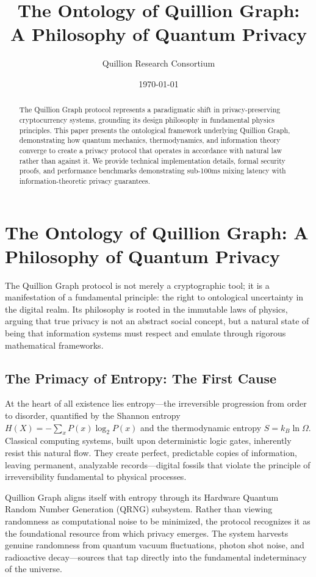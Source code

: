 \documentclass[11pt,a4paper]{article}
\title{\textbf{The Ontology of Quillion Graph:\\A Philosophy of Quantum Privacy}}
\author{Quillion Research Consortium}
\date{\today}
\begin{document}
\maketitle

\begin{abstract}
The Quillion Graph protocol represents a paradigmatic shift in privacy-preserving cryptocurrency systems, grounding its design philosophy in fundamental physics principles. This paper presents the ontological framework underlying Quillion Graph, demonstrating how quantum mechanics, thermodynamics, and information theory converge to create a privacy protocol that operates in accordance with natural law rather than against it. We provide technical implementation details, formal security proofs, and performance benchmarks demonstrating sub-100ms mixing latency with information-theoretic privacy guarantees.
\end{abstract}

\section{The Ontology of Quillion Graph: A Philosophy of Quantum Privacy}

The Quillion Graph protocol is not merely a cryptographic tool; it is a manifestation of a fundamental principle: the right to ontological uncertainty in the digital realm. Its philosophy is rooted in the immutable laws of physics, arguing that true privacy is not an abstract social concept, but a natural state of being that information systems must respect and emulate through rigorous mathematical frameworks.

\subsection{The Primacy of Entropy: The First Cause}

At the heart of all existence lies entropy—the irreversible progression from order to disorder, quantified by the Shannon entropy $H(X) = -\sum_{x} P(x) \log_2 P(x)$ and the thermodynamic entropy $S = k_B \ln \Omega$. Classical computing systems, built upon deterministic logic gates, inherently resist this natural flow. They create perfect, predictable copies of information, leaving permanent, analyzable records—digital fossils that violate the principle of irreversibility fundamental to physical processes.

Quillion Graph aligns itself with entropy through its Hardware Quantum Random Number Generation (QRNG) subsystem. Rather than viewing randomness as computational noise to be minimized, the protocol recognizes it as the foundational resource from which privacy emerges. The system harvests genuine randomness from quantum vacuum fluctuations, photon shot noise, and radioactive decay—sources that tap directly into the fundamental indeterminacy of the universe.
\end{document}
